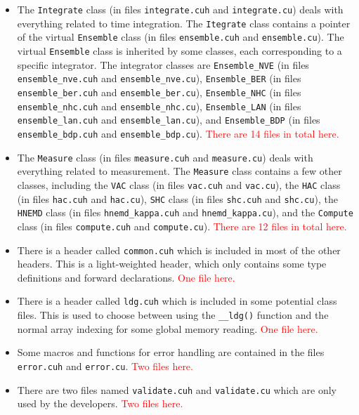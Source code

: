 \documentclass[12pt,a4paper]{report}
\begin{document}
\begin{itemize}
\item The \verb"Integrate" class (in files \verb"integrate.cuh" and \verb"integrate.cu") deals with everything related to time integration. The \verb"Itegrate" class contains a pointer of the virtual \verb"Ensemble" class (in files \verb"ensemble.cuh" and \verb"ensemble.cu"). The virtual \verb"Ensemble" class is inherited by some classes, each corresponding to a specific integrator. The integrator classes are \verb"Ensemble_NVE" (in files \verb"ensemble_nve.cuh" and \verb"ensemble_nve.cu"), \verb"Ensemble_BER" (in files \verb"ensemble_ber.cuh" and \verb"ensemble_ber.cu"), \verb"Ensemble_NHC" (in files \verb"ensemble_nhc.cuh" and \verb"ensemble_nhc.cu"), \verb"Ensemble_LAN" (in files \verb"ensemble_lan.cuh" and \verb"ensemble_lan.cu"), and \verb"Ensemble_BDP" (in files \verb"ensemble_bdp.cuh" and \verb"ensemble_bdp.cu").  \textcolor{red}{There are 14 files in total here.}

\item The \verb"Measure" class (in files \verb"measure.cuh" and \verb"measure.cu") deals with everything related to measurement. The \verb"Measure" class contains a few other classes, including the  \verb"VAC" class (in files \verb"vac.cuh" and \verb"vac.cu"), the \verb"HAC" class (in files \verb"hac.cuh" and \verb"hac.cu"), \verb"SHC" class (in files \verb"shc.cuh" and \verb"shc.cu"), the \verb"HNEMD" class (in files \verb"hnemd_kappa.cuh" and \verb"hnemd_kappa.cu"), and the \verb"Compute" class (in files \verb"compute.cuh" and \verb"compute.cu"). \textcolor{red}{There are 12 files in total here.}

\item There is a header called \verb"common.cuh" which is included in most of the other headers. This is a light-weighted header, which only contains some type definitions and forward declarations. \textcolor{red}{One file here.}

\item There is a header called \verb"ldg.cuh" which is included in some potential class files. This is used to choose between using the \verb"__ldg()" function and the normal array indexing for some global memory reading. \textcolor{red}{One file here.}

\item Some macros and functions for error handling are contained in the files \verb"error.cuh" and \verb"error.cu". \textcolor{red}{Two files here.}

\item There are two files named \verb"validate.cuh" and \verb"validate.cu" which are only used by the developers. \textcolor{red}{Two files here.}
\end{itemize}
\end{document}
